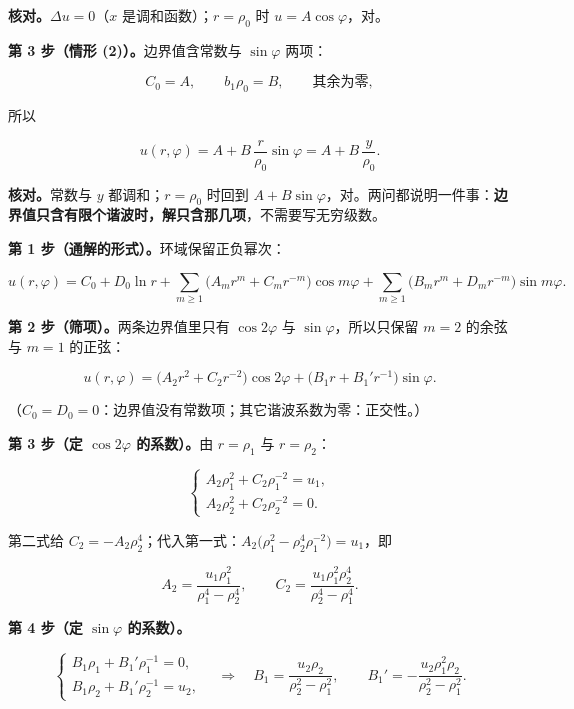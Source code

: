 \textbf{核对。}$\Delta u=0$（$x$ 是调和函数）；$r=\rho_0$ 时 $u=A\cos\varphi$，对。

\textbf{第 3 步（情形 (2)）。}边界值含常数与 $\sin\varphi$ 两项：

\[
C_0=A,\qquad b_1\rho_0=B,\qquad \text{其余为零},
\]

所以

\[
u(r,\varphi)=A+B\,\frac{r}{\rho_0}\sin\varphi=A+B\,\frac{y}{\rho_0}.
\]

\textbf{核对。}常数与 $y$ 都调和；$r=\rho_0$ 时回到 $A+B\sin\varphi$，对。两问都说明一件事：\textbf{边界值只含有限个谐波时，解只含那几项}，不需要写无穷级数。


\textbf{第 1 步（通解的形式）。}环域保留正负幂次：

\[
u(r,\varphi)=C_0+D_0\ln r+\sum_{m\ge1}\big(A_mr^m+C_mr^{-m}\big)\cos m\varphi+\sum_{m\ge1}\big(B_mr^m+D_mr^{-m}\big)\sin m\varphi .
\]

\textbf{第 2 步（筛项）。}两条边界值里只有 $\cos2\varphi$ 与 $\sin\varphi$，所以只保留 $m=2$ 的余弦与 $m=1$ 的正弦：

\[
u(r,\varphi)=\big(A_2r^2+C_2r^{-2}\big)\cos2\varphi+\big(B_1r+B_1'r^{-1}\big)\sin\varphi .
\]

（$C_0=D_0=0$：边界值没有常数项；其它谐波系数为零：正交性。）

\textbf{第 3 步（定 $\cos2\varphi$ 的系数）。}由 $r=\rho_1$ 与 $r=\rho_2$：

\[
\begin{cases}
A_2\rho_1^2+C_2\rho_1^{-2}=u_1,\\[2pt]
A_2\rho_2^2+C_2\rho_2^{-2}=0 .
\end{cases}
\]

第二式给 $C_2=-A_2\rho_2^4$；代入第一式：$A_2\big(\rho_1^2-\rho_2^4\rho_1^{-2}\big)=u_1$，即

\[
A_2=\frac{u_1\rho_1^2}{\rho_1^4-\rho_2^4},\qquad C_2=\frac{u_1\rho_1^2\rho_2^4}{\rho_2^4-\rho_1^4}.
\]

\textbf{第 4 步（定 $\sin\varphi$ 的系数）。}

\[
\begin{cases}
B_1\rho_1+B_1'\rho_1^{-1}=0,\\[2pt]
B_1\rho_2+B_1'\rho_2^{-1}=u_2,
\end{cases}
\quad\Longrightarrow\quad
B_1=\frac{u_2\rho_2}{\rho_2^2-\rho_1^2},\qquad B_1'=-\frac{u_2\rho_1^2\rho_2}{\rho_2^2-\rho_1^2}.
\]

